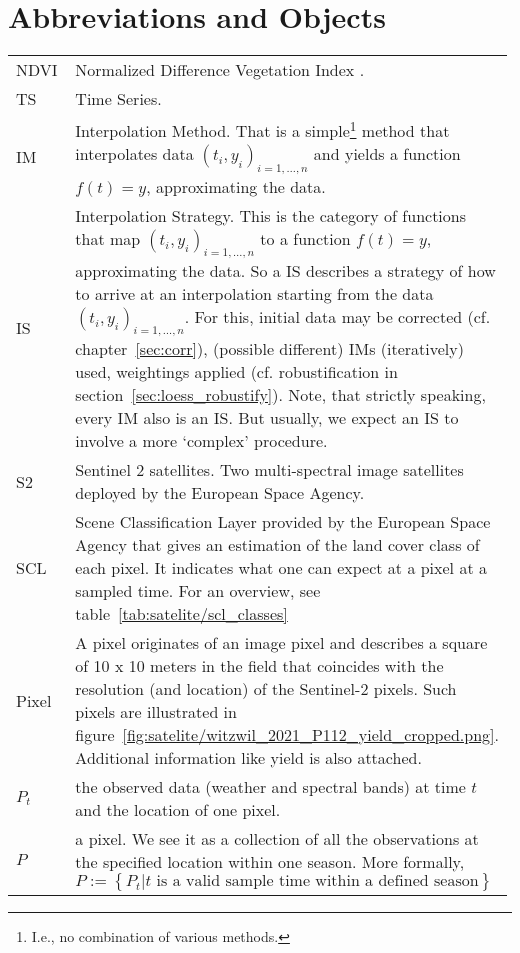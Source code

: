 \section*{Abbreviations and Objects}\vspace{-0.2cm}
\begin{longtable}{p{0.12\linewidth} p{0.87\linewidth}}
NDVI	
		& Normalized Difference Vegetation Index \citep{rouseMonitoringVernalAdvancement1974}.\\

TS	
		& Time Series. \\
IM	
		& Interpolation Method. That is a simple\footnote{I.e., no combination of various methods.} method that interpolates data $(t_i,y_i)_{i = 1,\dots ,n}$ and yields a function $f(t)=y$, approximating the data. \\
IS	
		& Interpolation Strategy. This is the category of functions that map $(t_i,y_i)_{i=1,\dots,n}$ to a function $f(t)=y$, approximating the data. So a IS describes a strategy of how to arrive at an interpolation starting from the data $(t_i,y_i)_{i=1,\dots,n}$. For this, initial data may be corrected (cf. chapter~\ref{sec:corr}), (possible different) IMs (iteratively) used, weightings applied (cf. robustification in section~\ref{sec:loess_robustify}). Note, that strictly speaking, every IM also is an IS. But usually, we expect an IS to involve a more `complex' procedure. \\
S2	
		& Sentinel 2 satellites. Two multi-spectral image satellites deployed by the European Space Agency. \\
SCL	
		& Scene Classification Layer provided by the European Space Agency that gives an estimation of the land cover class of each pixel. It indicates what one can expect at a pixel at a sampled time. For an overview, see table~\ref{tab:satelite/scl_classes}\\
Pixel	
		& A pixel originates of an image pixel and describes a square of 10 x 10 meters in the field that coincides with the resolution (and location) of the Sentinel-2 pixels. Such pixels are illustrated in figure~\ref{fig:satelite/witzwil_2021_P112_yield_cropped.png}. Additional information like yield is also attached.\\

$P_t$	
		& the observed data (weather and spectral bands) at time $t$ and the location of one pixel. \\

$P$	
		& a pixel. We see it as a collection of all the observations at the specified location within one season. More formally, $P := \left\{P_t | t\text{ is a valid sample time within a defined season}\right\}$\\



\end{longtable}

